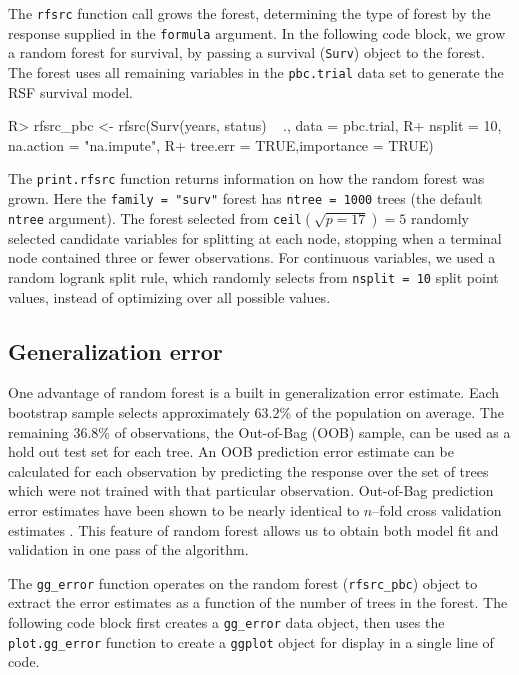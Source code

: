 \documentclass[article, nojss]{jss}
\begin{document}
The  \texttt{rfsrc} function call grows the forest,
determining the type of forest by the response supplied in the
\texttt{formula} argument. In the following code block, we grow a random
forest for survival, by passing a survival (\texttt{Surv}) object to the
forest. The forest uses all remaining variables in the
\texttt{pbc.trial} data set to generate the RSF survival model.

\begin{Schunk}
\begin{Sinput}
R> rfsrc_pbc <- rfsrc(Surv(years, status) ~ ., data = pbc.trial,
R+                    nsplit = 10, na.action = "na.impute",
R+                    tree.err = TRUE,importance = TRUE)
\end{Sinput}
\end{Schunk}

The \texttt{print.rfsrc} function returns information on how the random
forest was grown. Here the \texttt{family\ =\ "surv"} forest has
\texttt{ntree\ =\ 1000} trees (the default \texttt{ntree} argument). The
forest selected from \texttt{ceil}\((\sqrt{p=17}) = 5\) randomly
selected candidate variables for splitting at each node, stopping when a
terminal node contained three or fewer observations. For continuous
variables, we used a random logrank split rule, which randomly selects
from \texttt{nsplit\ =\ 10} split point values, instead of optimizing
over all possible values.

\subsection{Generalization error}\label{generalization-error}

One advantage of random forest is a built in generalization error
estimate. Each bootstrap sample selects approximately \(63.2\%\) of the
population on average. The remaining \(36.8\%\) of observations, the
Out-of-Bag \citep{BreimanOOB:1996e} (OOB) sample, can be used as a hold
out test set for each tree. An OOB prediction error estimate can be
calculated for each observation by predicting the response over the set
of trees which were not trained with that particular observation.
Out-of-Bag prediction error estimates have been shown to be nearly
identical to \(n\)--fold cross validation estimates
\citep{StatisticalLearning:2009}. This feature of random forest allows
us to obtain both model fit and validation in one pass of the algorithm.

The \texttt{gg\_error} function operates on the random forest
(\texttt{rfsrc\_pbc}) object to extract the error estimates as a
function of the number of trees in the forest. The following code block
first creates a \texttt{gg\_error} data object, then uses the
\texttt{plot.gg\_error} function to create a \texttt{ggplot} object for
display in a single line of code.
\end{document}

